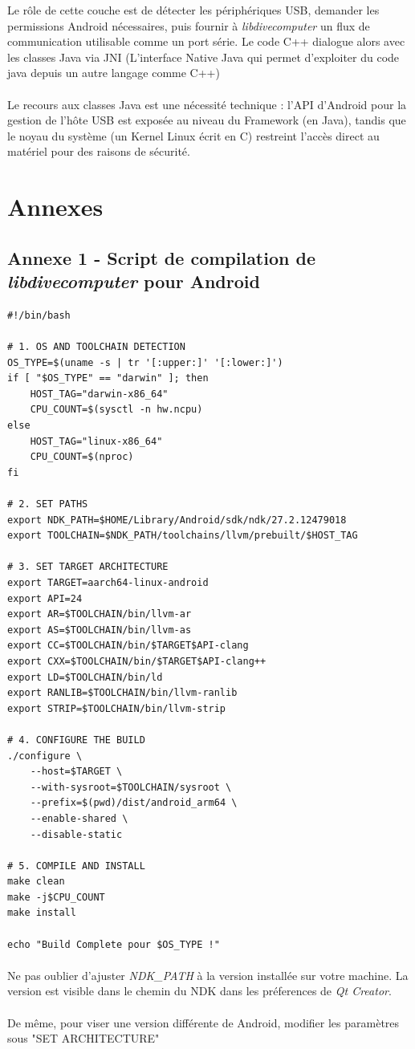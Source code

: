\documentclass{article}
\begin{document}
Le rôle de cette couche est de détecter les périphériques USB, demander les
permissions Android nécessaires, puis fournir à \textit{libdivecomputer} un flux
de communication utilisable comme un port série. Le code C++ dialogue alors avec
les classes Java via JNI (L'interface Native Java qui permet d'exploiter du code java depuis un autre langage comme C++)

\paragraph{}
Le recours aux classes Java est une nécessité technique : l'API d'Android pour la gestion de l'hôte USB est exposée au niveau du Framework (en Java), tandis que le noyau du système (un Kernel Linux écrit en C) restreint l'accès direct au matériel pour des raisons de sécurité.

\section{Annexes}
\subsection{Annexe 1 - Script de compilation de \textit{libdivecomputer} pour Android}
\begin{verbatim}
#!/bin/bash

# 1. OS AND TOOLCHAIN DETECTION
OS_TYPE=$(uname -s | tr '[:upper:]' '[:lower:]')
if [ "$OS_TYPE" == "darwin" ]; then
    HOST_TAG="darwin-x86_64"
    CPU_COUNT=$(sysctl -n hw.ncpu)
else
    HOST_TAG="linux-x86_64"
    CPU_COUNT=$(nproc)
fi

# 2. SET PATHS
export NDK_PATH=$HOME/Library/Android/sdk/ndk/27.2.12479018
export TOOLCHAIN=$NDK_PATH/toolchains/llvm/prebuilt/$HOST_TAG

# 3. SET TARGET ARCHITECTURE
export TARGET=aarch64-linux-android
export API=24
export AR=$TOOLCHAIN/bin/llvm-ar
export AS=$TOOLCHAIN/bin/llvm-as
export CC=$TOOLCHAIN/bin/$TARGET$API-clang
export CXX=$TOOLCHAIN/bin/$TARGET$API-clang++
export LD=$TOOLCHAIN/bin/ld
export RANLIB=$TOOLCHAIN/bin/llvm-ranlib
export STRIP=$TOOLCHAIN/bin/llvm-strip

# 4. CONFIGURE THE BUILD
./configure \
    --host=$TARGET \
    --with-sysroot=$TOOLCHAIN/sysroot \
    --prefix=$(pwd)/dist/android_arm64 \
    --enable-shared \
    --disable-static

# 5. COMPILE AND INSTALL
make clean
make -j$CPU_COUNT
make install

echo "Build Complete pour $OS_TYPE !"

\end{verbatim}
\paragraph{}
Ne pas oublier d'ajuster \textit{NDK\_PATH} à la version installée sur votre machine. La version est visible dans le chemin du NDK dans les préferences de \textit{Qt Creator}.
\paragraph{}
De même, pour viser une version différente de Android, modifier les paramètres sous "SET ARCHITECTURE"
\end{document}
